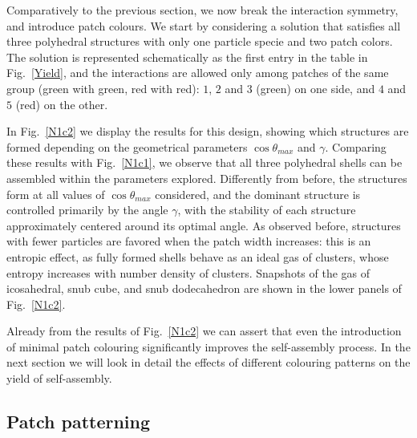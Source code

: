 \documentclass[a4paper, amsfonts, amssymb, amsmath, reprint, showkeys, nofootinbib, twoside]{revtex4-1}
\begin{document}
Comparatively to the previous section, we now break the interaction symmetry, and introduce patch colours.
We start by considering a solution that satisfies all three polyhedral structures with only one particle specie and two patch colors.
The solution is represented schematically as the first entry in the table in Fig.~\ref{Yield}, and the interactions are allowed only among patches of the same group (green with green, red with red): $1$, $2$ and $3$ (green) on one side, and $4$ and $5$ (red) on the other.

In Fig.~\ref{N1c2} we display the results for this design, showing which structures are formed depending on the geometrical parameters $\cos\theta_{max}$ and $\gamma$. Comparing these results with Fig.~\ref{N1c1}, we observe that all three polyhedral shells can be assembled within the parameters explored. Differently from before, the structures form at all values of $\cos\theta_{max}$ considered, and the dominant structure is controlled primarily by the angle $\gamma$, with the stability of each structure approximately centered around its optimal angle. As observed before, structures with fewer particles are favored when the patch width increases: this is an entropic effect, as fully formed shells behave as an ideal gas of clusters, whose entropy increases with number density of clusters. Snapshots of the gas of icosahedral, snub cube, and snub dodecahedron are shown in the lower panels of Fig.~\ref{N1c2}.

Already from the results of Fig.~\ref{N1c2} we can assert that even the introduction of minimal patch colouring significantly improves the self-assembly process. In the next section we will look in detail the effects of different colouring patterns on the yield of self-assembly.


\subsection{Patch patterning}
\end{document}
